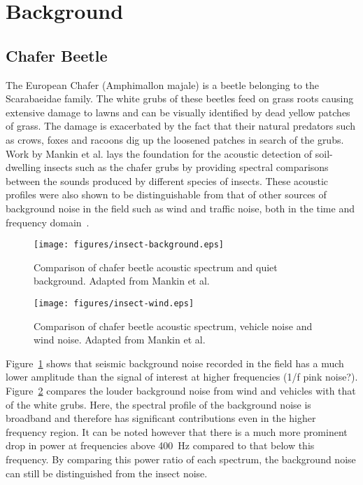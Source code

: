 \documentclass[twocolumn]{article}
\begin{document}
\section{Background}
\subsection{Chafer Beetle}
The European Chafer (Amphimallon majale) is a beetle belonging to the Scarabaeidae family. The white grubs of these beetles feed on grass roots causing extensive damage to lawns and can be visually identified by dead yellow patches of grass. The damage is exacerbated by the fact that their natural predators such as crows, foxes and racoons dig up the loosened patches in search of the grubs. Work by Mankin et al. lays the foundation for the acoustic detection of soil-dwelling insects such as the chafer grubs by providing spectral comparisons between the sounds produced by different species of insects. These acoustic profiles were also shown to be distinguishable from that of other sources of background noise in the field such as wind and traffic noise, both in the time and frequency domain~\cite{mankin_mccoy_shapiro_1998}.

\begin{figure}
    \centering
    \texttt{[image: figures/insect-background.eps]}
    \caption{Comparison of chafer beetle acoustic spectrum and quiet background. Adapted from Mankin et al.~\cite{mankin_mccoy_shapiro_1998}}
    \label{fig:insect-background}
\end{figure}

\begin{figure}
    \centering
    \texttt{[image: figures/insect-wind.eps]}
    \caption{Comparison of chafer beetle acoustic spectrum, vehicle noise and wind noise. Adapted from Mankin et al.~\cite{mankin_mccoy_shapiro_1998}}
    \label{fig:insect-wind}
\end{figure}

Figure~\ref{fig:insect-background} shows that seismic background noise recorded in the field has a much lower amplitude than the signal of interest at higher frequencies (1/f pink noise?). Figure~\ref{fig:insect-wind} compares the louder background noise from wind and vehicles with that of the white grubs. Here, the spectral profile of the background noise is broadband and therefore has significant contributions even in the higher frequency region. It can be noted however that there is a much more prominent drop in power at frequencies above \SI{400}{Hz} compared to that below this frequency. By comparing this power ratio of each spectrum, the background noise can still be distinguished from the insect noise.
\end{document}
